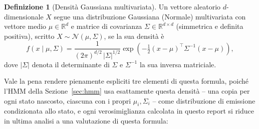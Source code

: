 \documentclass[11pt]{article}
\theoremstyle{definition}
\newtheorem{definition}[theorem]{Definizione}
\theoremstyle{remark}
\begin{document}
\begin{definition}[Densit\`a Gaussiana multivariata]
Un vettore aleatorio $d$-dimensionale $X$ segue una distribuzione Gaussiana (Normale) multivariata con vettore medio $\mu\in\mathbb{R}^d$ e matrice di covarianza $\Sigma\in\mathbb{R}^{d\times d}$ (simmetrica e definita positiva), scritto $X\sim\mathcal N(\mu,\Sigma)$, se la sua densit\`a \`e
\[
f(x\mid\mu,\Sigma) = \frac{1}{(2\pi)^{d/2}\,|\Sigma|^{1/2}}\exp\!\left(-\tfrac12(x-\mu)^\top\Sigma^{-1}(x-\mu)\right),
\]
dove $|\Sigma|$ denota il determinante di $\Sigma$ e $\Sigma^{-1}$ la sua inversa matriciale.
\end{definition}
Vale la pena rendere pienamente espliciti tre elementi di questa formula, poich\'e l'HMM della Sezione~\ref{sec:hmm} usa esattamente questa densit\`a -- una copia per ogni stato nascosto, ciascuna con i propri $\mu_i,\Sigma_i$ -- come distribuzione di emissione condizionata allo stato, e ogni verosimiglianza calcolata in questo report si riduce in ultima analisi a una valutazione di questa formula:
\end{document}
